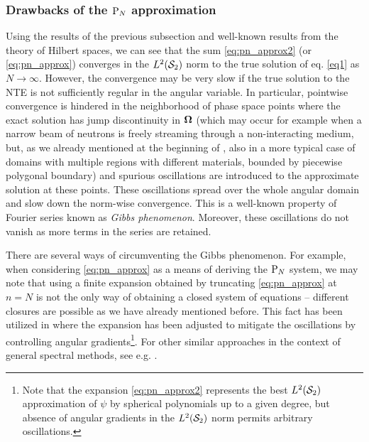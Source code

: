 \subsubsection{Drawbacks of the $\PN$ approximation}
Using the results of the previous subsection and well-known results from the theory of Hilbert spaces, we can see that
the sum \eqref{eq:pn_approx2} (or \eqref{eq:pn_approx}) converges in the $\Lp[2](\Sphere)$ norm to the true solution of
eq. \eqref{eq1} as $N\to\infty$. However, the convergence may be very slow if the true solution to the NTE is not
sufficiently regular in the angular variable. In particular, pointwise convergence is hindered in the neighborhood of
phase space points where the exact solution has jump discontinuity in $\bomega$ (which may occur for example
when a narrow beam of neutrons is freely streaming through a non-interacting medium, but, as we already mentioned at the
beginning of , also in a more typical case of domains with multiple regions with different materials,
bounded by piecewise polygonal boundary) and spurious oscillations are introduced to the approximate solution at these points.
These oscillations spread over the whole angular domain and slow down the norm-wise convergence. This is a well-known
property of Fourier series known as \textit{Gibbs
phenomenon}.
Moreover, these oscillations do not vanish as more terms in the series are retained. 

There are several ways of
circumventing the Gibbs phenomenon. For example, when considering \eqref{eq:pn_approx} as a means of deriving the $\PN$
system, we may note that using a finite expansion obtained by truncating \eqref{eq:pn_approx} at $n=N$ is not the only
way of obtaining a closed system of equations -- different closures are possible as we have already mentioned before.
This fact has been utilized in \cite{McClarren3} where the expansion has been adjusted to mitigate the oscillations by controlling
angular gradients\footnote{Note that the expansion \eqref{eq:pn_approx2} represents the best $\Lp[2](\Sphere)$
approximation of $\psi$ by spherical polynomials up to a given degree, but absence of angular gradients in the
$\Lp[2](\Sphere)$ norm permits arbitrary oscillations.}. For other similar approaches in the context of general spectral
methods, see e.g. \cite{Tanner}.

